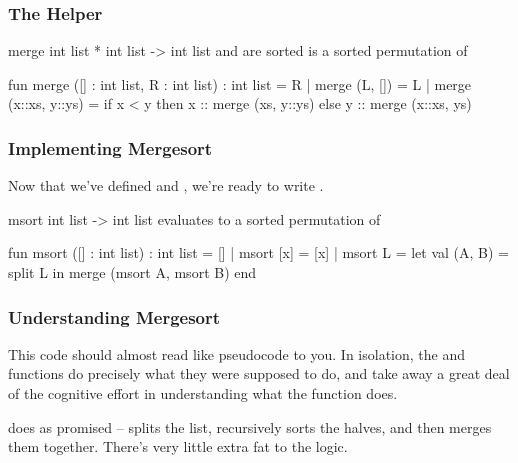 \documentclass[aspectratio=169, handout]{beamer}
\begin{document}
\begin{frame}[fragile]
  \frametitle{The  Helper}

  \spec
    {merge}
    {int list * int list -> int list}
    { and  are sorted}
    { is a sorted permutation of }

  \pause 
  \vspace{\fill}

  \begin{codeblock}
    fun merge ([] : int list, R : int list) : int list = R
      | merge (L, []) = L
      | merge (x::xs, y::ys) =
          if x < y then
            x :: merge (xs, y::ys)
          else
            y :: merge (x::xs, ys)
  \end{codeblock}
\end{frame}

\begin{frame}[fragile]
  \frametitle{Implementing Mergesort}

  Now that we've defined  and , we're ready to write .

  \pause 
  \vspace{\fill}

  \spec
    {msort}
    {int list -> int list}
    {}
    { evaluates to a sorted permutation of }

  \pause 
  \vspace{\fill}

  \begin{codeblock}
    fun msort ([] : int list) : int list = []
      | msort [x] = [x]
      | msort L = 
          let
            val (A, B) = split L 
          in
            merge (msort A, msort B) 
          end
  \end{codeblock}
\end{frame}

\begin{frame}[fragile]
  \frametitle{Understanding Mergesort}

  \rprs

  This code should almost read like pseudocode to you. In isolation, the
   and  functions do precisely what they were supposed
  to do, and take away a great deal of the cognitive effort in understanding
  what the  function does.

  \pause 
  \vspace{\fill}

   does as promised -- splits the list, recursively sorts the
  halves, and then merges them together. There's very little extra fat to the
  logic.

  \pause 
  \vspace{\fill}

\end{frame}
\end{document}
